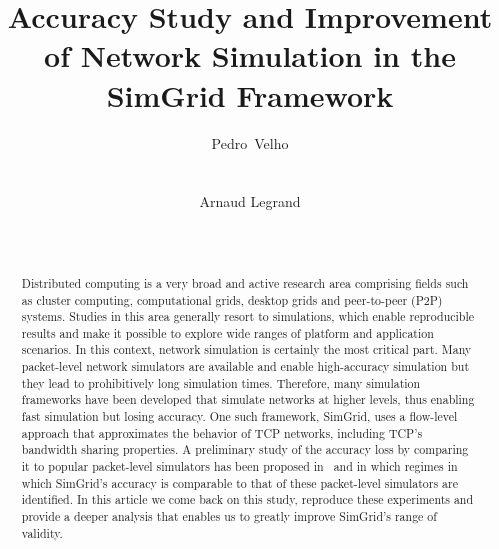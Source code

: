 \documentclass{sig-alternate}
\begin{document}

\title{Accuracy Study and Improvement of Network Simulation in the
  SimGrid Framework}

\author{
\alignauthor
\mbox{Pedro Velho}\\
       \\
       \\
\alignauthor
Arnaud Legrand\\
       \\
       \\
}

\maketitle

\newcommand{\simgrid}{SimGrid\xspace}%
\newcommand{\gtnets}{GTNetS\xspace}%
\begin{abstract}
  Distributed computing is a very broad and active research area
  comprising fields such as cluster computing, computational grids,
  desktop grids and peer-to-peer (P2P) systems. Studies in this area
  generally resort to simulations, which enable reproducible results
  and make it possible to explore wide ranges of platform and
  application scenarios.  In this context, network simulation is
  certainly the most critical part. 
  Many packet-level network simulators are
  available and enable high-accuracy simulation but they lead to
  prohibitively long simulation times. Therefore, many simulation
  frameworks have been developed that simulate networks at higher
  levels, thus enabling fast simulation but losing accuracy.  One such
  framework, \simgrid, uses a flow-level approach that approximates
  the behavior of TCP networks, including TCP's bandwidth sharing
  properties. A preliminary study of the accuracy loss by comparing it
  to popular packet-level simulators has been proposed
  in~\cite{nstools07} and in which regimes in which \simgrid's accuracy
  is comparable to that of these packet-level simulators are
  identified. In this article we come back on this study, reproduce
  these experiments and provide a deeper analysis that enables us to
  greatly improve \simgrid's range of validity.
\end{abstract}
\end{document}
